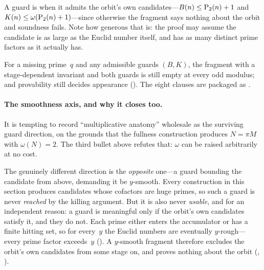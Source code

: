 A guard is  when it admits the orbit's own
candidates---$B(n) \leq \mathrm{P}_{2}(n) + 1$ and $K(n) \leq
\omega(\mathrm{P}_{2}(n)+1)$---since otherwise the fragment says nothing about
the orbit and soundness fails.  Note how generous that is: the proof may
assume the candidate is as large as the Euclid number itself, and has as
many distinct prime factors as it actually has.

\begin{theorem}
\label{thm:widened-unprovability}
For a missing prime~$q$ and any admissible guards $(B, K)$, the fragment
with a stage-dependent invariant and both guards is still empty at every
odd modulus; and provability still decides appearance
().
The eight clauses are packaged as
.
\end{theorem}

\paragraph{The smoothness axis, and why it closes too.}
It is tempting to record ``multiplicative anatomy'' wholesale as the
surviving guard direction, on the grounds that the fullness construction
produces $N = \pi M$ with $\omega(N) = 2$.  The third bullet above
refutes that: $\omega$ can be raised arbitrarily at no cost.

The genuinely different direction is the \emph{opposite} one---a guard
bounding the candidate from above, demanding it be $y$-smooth.  Every
construction in this section produces candidates whose cofactors are
huge primes, so such a guard is never \emph{reached} by the killing
argument.  But it is also never \emph{usable}, and for an independent
reason: a guard is meaningful only if the orbit's own candidates satisfy
it, and they do not.  Each prime either enters the accumulator or has a
finite hitting set, so for every~$y$ the Euclid numbers are eventually
$y$-rough---every prime factor exceeds~$y$
().  A
$y$-smooth fragment therefore excludes the orbit's own candidates from
some stage on, and proves nothing about the orbit
(,
).

